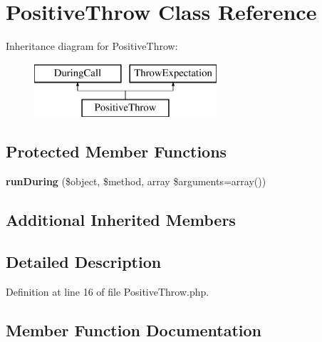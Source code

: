 \section{Positive\+Throw Class Reference}
\label{class_php_spec_1_1_wrapper_1_1_subject_1_1_expectation_1_1_positive_throw}
Inheritance diagram for Positive\+Throw\+:\begin{figure}[H]
\begin{center}
\leavevmode
\includegraphics[height=2.000000cm]{class_php_spec_1_1_wrapper_1_1_subject_1_1_expectation_1_1_positive_throw}
\end{center}
\end{figure}
\subsection*{Protected Member Functions}
\begin{DoxyCompactItemize}
\item 
{\bf run\+During} (\$object, \$method, array \$arguments=array())
\end{DoxyCompactItemize}
\subsection*{Additional Inherited Members}


\subsection{Detailed Description}


Definition at line 16 of file Positive\+Throw.\+php.



\subsection{Member Function Documentation}
